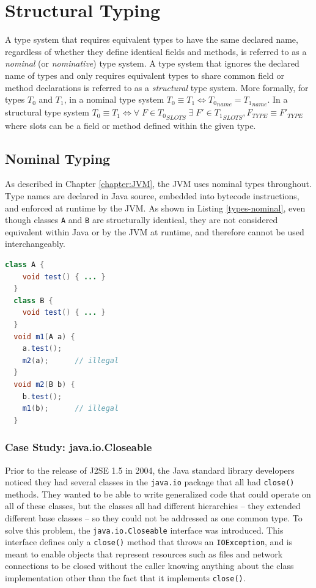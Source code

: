 \chapter{Structural Typing}
\label{chapter:StructuralTyping}
\lhead{ \leftmark }

A type system that requires equivalent types to have the same declared name, regardless of whether they define identical fields and methods, is referred to as a \emph{nominal} (or \emph{nominative}) type system.  A type system that ignores the declared name of types and only requires equivalent types to share common field or method declarations is referred to as a \emph{structural} type system.  More formally, for types $T_0$ and $T_1$, in a nominal type system $T_0 \equiv T_1 \iff {T_0}_{name} = {T_1}_{name}$. In a structural type system $T_0 \equiv T_1 \iff \forall \; F \in {T_0}_{SLOTS} \; \exists \; F' \in {T_1}_{SLOTS}, F_{TYPE} \equiv {F'}_{TYPE} $ where slots can be a field or method defined within the given type.

\section{Nominal Typing}

As described in Chapter \ref{chapter:JVM}, the JVM uses nominal types throughout.  Type names are declared in Java source, embedded into bytecode instructions, and enforced at runtime by the JVM.  As shown in Listing \ref{types-nominal}, even though classes \texttt{A} and \texttt{B} are structurally identical, they are not considered equivalent within Java or by the JVM at runtime, and therefore cannot be used interchangeably.

\begin{lstlisting}[language=Java,caption=Nominal types,label=types-nominal]
  class A {
    void test() { ... }
  }
  class B {
    void test() { ... }
  }
  void m1(A a) {
    a.test();
    m2(a);      // illegal
  }
  void m2(B b) {
    b.test();
    m1(b);      // illegal
  }
\end{lstlisting}


\subsection{Case Study: java.io.Closeable}

Prior to the release of J2SE 1.5 in 2004, the Java standard library developers noticed they had several classes in the \texttt{java.io} package that all had \texttt{close()} methods.  They wanted to be able to write generalized code that could operate on all of these classes, but the classes all had different hierarchies -- they extended different base classes -- so they could not be addressed as one common type.  To solve this problem, the \texttt{java.io.Closeable} interface was introduced.  This interface defines only a \texttt{close()} method that throws an \texttt{IOException}, and is meant to enable objects that represent resources such as files and network connections to be closed without the caller knowing anything about the class implementation other than the fact that it implements \texttt{close()}.

